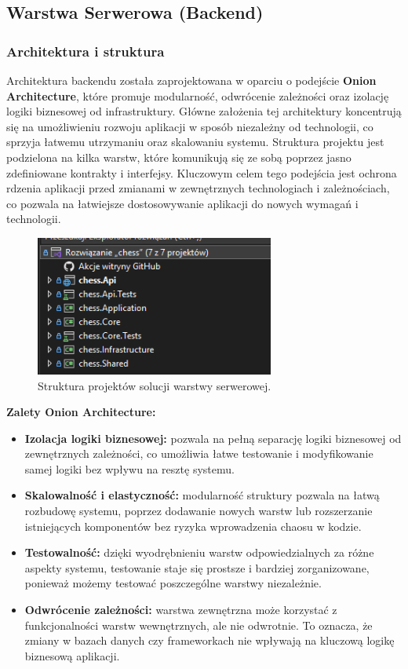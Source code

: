 \documentclass[12pt,a4paper]{article}
\begin{document}
\newpage

\subsection{Warstwa Serwerowa (Backend)} 
\subsubsection{Architektura i struktura} 
Architektura backendu została zaprojektowana w oparciu o podejście \textbf{Onion Architecture}, które promuje modularność, odwrócenie zależności oraz izolację logiki biznesowej od infrastruktury. Główne założenia tej architektury koncentrują się na umożliwieniu rozwoju aplikacji w sposób niezależny od technologii, co sprzyja łatwemu utrzymaniu oraz skalowaniu systemu. Struktura projektu jest podzielona na kilka warstw, które komunikują się ze sobą poprzez jasno zdefiniowane kontrakty i interfejsy. Kluczowym celem tego podejścia jest ochrona rdzenia aplikacji przed zmianami w zewnętrznych technologiach i zależnościach, co pozwala na łatwiejsze dostosowywanie aplikacji do nowych wymagań i technologii.

\begin{figure}[h!] 
    \centering 
    \includegraphics[width=0.7\textwidth]{images/struktura_back.png} 
    \caption{Struktura projektów solucji warstwy serwerowej.} 
\end{figure}

\noindent \textbf{Zalety Onion Architecture:}
\begin{itemize}
    \item \textbf{Izolacja logiki biznesowej:} pozwala na pełną separację logiki biznesowej od zewnętrznych zależności, co umożliwia łatwe testowanie i modyfikowanie samej logiki bez wpływu na resztę systemu.
    \item \textbf{Skalowalność i elastyczność:} modularność struktury pozwala na łatwą rozbudowę systemu, poprzez dodawanie nowych warstw lub rozszerzanie istniejących komponentów bez ryzyka wprowadzenia chaosu w kodzie.
    \item \textbf{Testowalność:} dzięki wyodrębnieniu warstw odpowiedzialnych za różne aspekty systemu, testowanie staje się prostsze i bardziej zorganizowane, ponieważ możemy testować poszczególne warstwy niezależnie.
    \item \textbf{Odwrócenie zależności:} warstwa zewnętrzna może korzystać z funkcjonalności warstw wewnętrznych, ale nie odwrotnie. To oznacza, że zmiany w bazach danych czy frameworkach nie wpływają na kluczową logikę biznesową aplikacji.
\end{itemize}
\end{document}
